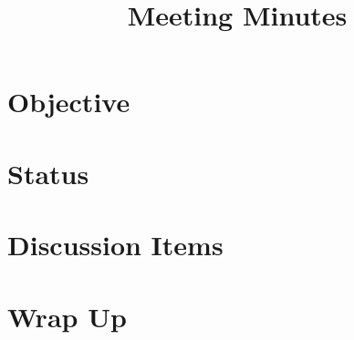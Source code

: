 \title{Meeting Minutes}
\maketitle

\section{Objective}


\section{Status}



\section{Discussion Items} 


\section{Wrap Up}
 \newline \newline
